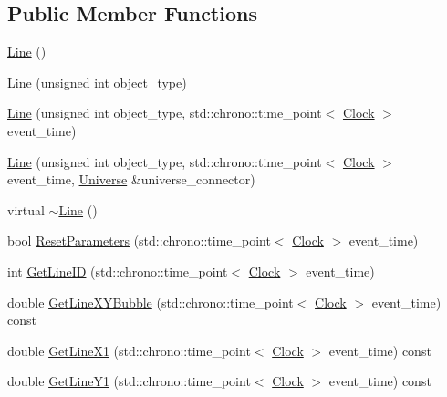 \subsection*{Public Member Functions}
\begin{DoxyCompactItemize}
\item 
\mbox{\hyperlink{classLine_acc11b8a429d8cdd63ba6803dff5602b3}{Line}} ()
\item 
\mbox{\hyperlink{classLine_a4e3242660d8d3c1aa43e932560840552}{Line}} (unsigned int object\+\_\+type)
\item 
\mbox{\hyperlink{classLine_a5330353765ab0f965a4293bdc7c3564a}{Line}} (unsigned int object\+\_\+type, std\+::chrono\+::time\+\_\+point$<$ \mbox{\hyperlink{universe_8h_a0ef8d951d1ca5ab3cfaf7ab4c7a6fd80}{Clock}} $>$ event\+\_\+time)
\item 
\mbox{\hyperlink{classLine_a740aacdf468a1519f9a01d9cbd1f9219}{Line}} (unsigned int object\+\_\+type, std\+::chrono\+::time\+\_\+point$<$ \mbox{\hyperlink{universe_8h_a0ef8d951d1ca5ab3cfaf7ab4c7a6fd80}{Clock}} $>$ event\+\_\+time, \mbox{\hyperlink{classUniverse}{Universe}} \&universe\+\_\+connector)
\item 
virtual \mbox{\hyperlink{classLine_a4a95bafcefa28672b3999deb011b9e50}{$\sim$\+Line}} ()
\item 
bool \mbox{\hyperlink{classLine_af1756d1500ab0a5616313be6e213015a}{Reset\+Parameters}} (std\+::chrono\+::time\+\_\+point$<$ \mbox{\hyperlink{universe_8h_a0ef8d951d1ca5ab3cfaf7ab4c7a6fd80}{Clock}} $>$ event\+\_\+time)
\item 
int \mbox{\hyperlink{classLine_a20756feda4d42032955ec6cf12d89941}{Get\+Line\+ID}} (std\+::chrono\+::time\+\_\+point$<$ \mbox{\hyperlink{universe_8h_a0ef8d951d1ca5ab3cfaf7ab4c7a6fd80}{Clock}} $>$ event\+\_\+time)
\item 
double \mbox{\hyperlink{classLine_a8752cfce7330fbeda936778b77e534d0}{Get\+Line\+X\+Y\+Bubble}} (std\+::chrono\+::time\+\_\+point$<$ \mbox{\hyperlink{universe_8h_a0ef8d951d1ca5ab3cfaf7ab4c7a6fd80}{Clock}} $>$ event\+\_\+time) const
\item 
double \mbox{\hyperlink{classLine_ab14245ec4348e925b6e0f860e9254308}{Get\+Line\+X1}} (std\+::chrono\+::time\+\_\+point$<$ \mbox{\hyperlink{universe_8h_a0ef8d951d1ca5ab3cfaf7ab4c7a6fd80}{Clock}} $>$ event\+\_\+time) const
\item 
double \mbox{\hyperlink{classLine_ac09a53b36a300c38191269f110c73eb1}{Get\+Line\+Y1}} (std\+::chrono\+::time\+\_\+point$<$ \mbox{\hyperlink{universe_8h_a0ef8d951d1ca5ab3cfaf7ab4c7a6fd80}{Clock}} $>$ event\+\_\+time) const

\end{DoxyCompactItemize}
